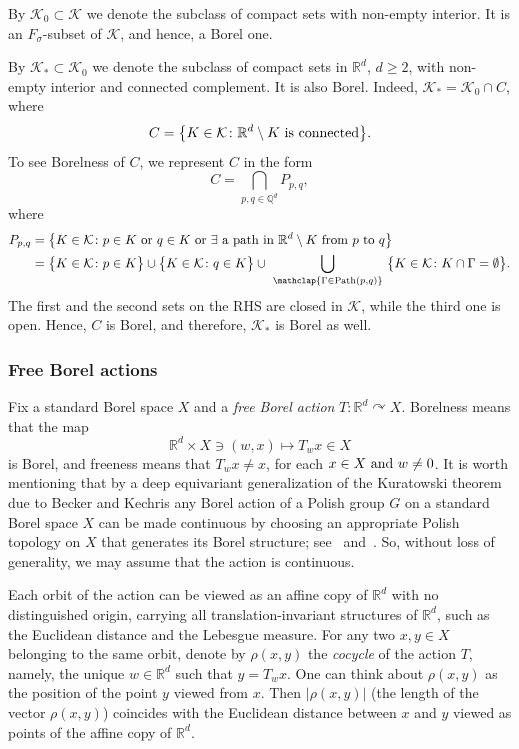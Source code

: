 \documentclass[11pt]{paper}
\newcommand{\bR}{\mathbb R}
\newcommand{\bQ}{\mathbb Q}
\newcommand{\cK}{\mathcal K}
\begin{document}
By $\cK_0 \subset \cK$ we denote the subclass of compact sets with non-empty interior. It is an $F_\sigma$-subset of $\cK$, and hence, a Borel one.

By $\cK_* \subset \cK_0$ we denote the subclass of compact sets in $\bR^d$, $d\ge 2$,
with non-empty interior and connected complement. It is also Borel. Indeed, $\cK_* = \cK_0 \cap C$, where
\[
C = \bigl\{K\in\cK\colon \bR^d\setminus K \ {\rm is\ connected} \bigr\}.
\]
To see Borelness of $C$, we represent $C$ in the form
\[
C = \bigcap_{p, q \in \bQ^d} P_{p, q},
\]
where
\begin{align*}
P_{p, q} &=
\bigl\{
K\in\cK\colon p\in K\ {\rm or\ } q\in K\ {\rm or\ } \exists \ {\rm a\ path\ in\ } \bR^d\setminus K\
{\rm from\ } p \ {\rm to\ } q \bigr\} \\
&= \bigl\{K\in\cK\colon  p\in K \bigr\} \cup    \bigl\{K\in\cK\colon q\in K \bigr\}
\cup \ \bigcup_{\mathclap{\Gamma\in\operatorname{Path}(p, q)}} \ \bigl\{K\in\cK\colon K \cap \Gamma = \emptyset \bigr\}.
\end{align*}
The first and the second sets on the RHS are closed in $\cK$, while the third one is open. Hence, $C$ is Borel,
and therefore, $\cK_*$  is Borel as well.


\subsubsection*{Free Borel actions}
Fix a standard Borel space $X$ and a {\em free Borel action} $ T\colon \bR^d \curvearrowright X$.
Borelness means that the map
\[ \bR^d \times X \ni (w, x) \mapsto T_w x \in X \]
is Borel, and freeness means that $T_w x \ne x$, for each $x\in X \ {\rm and\ } w\ne 0$.  It is
worth mentioning that by a deep equivariant generalization of the Kuratowski theorem due to Becker
and Kechris any Borel action of a Polish group $G$ on a standard Borel
space $X$ can be made continuous by choosing an appropriate Polish topology on $X$ that generates its Borel structure; see~\cite[Chapter 5]{Becker-Kechris} and~\cite[Lecture~II]{Kechris-Lectures}.
So, without loss of generality, we may assume that the action is continuous.



Each orbit of the action can be viewed as an affine copy of $\bR^d$ with no distinguished origin, carrying
all translation-invariant structures of $\bR^d$, such as the Euclidean distance and the Lebesgue measure.
For any two $x, y\in X$ belonging to the same orbit,
denote by $\rho (x, y)$ the {\em cocycle} of the action $T$, namely, the unique $w\in \bR^d$ such that
$y=T_w x$. One can think about $\rho (x, y)$ as the position of the point $y$ viewed from $x$.
Then $|\rho (x, y)|$ (the length of the vector $\rho (x, y)$) coincides with the Euclidean distance
between $x$ and $y$ viewed as points of the affine copy of $\bR^d$.
\end{document}
